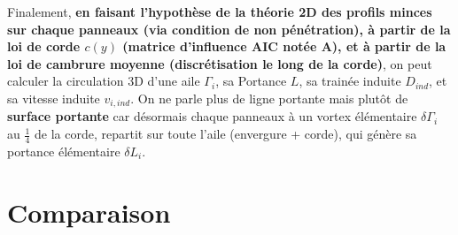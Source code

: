 Finalement, \textbf{en faisant l'hypothèse de la théorie 2D des profils minces sur chaque panneaux (via condition de non pénétration), à partir de la loi de corde $c(y)$ (matrice d'influence AIC notée A), et à partir de la loi de cambrure moyenne (discrétisation le long de la corde)}, on peut calculer la circulation 3D d'une aile $\Gamma_i$, sa Portance $L$, sa trainée induite $D_{ind}$, et sa vitesse induite $v_{i, ind}$. On ne parle plus de ligne portante mais plutôt de \textbf{surface portante} car désormais chaque panneaux à un vortex élémentaire $\delta\Gamma_i$ au $\frac{1}{4}$ de la corde, repartit sur toute l'aile (envergure + corde), qui génère sa portance élémentaire $\delta L_i$.


\section{Comparaison} 
\label{sec:Ch1.4}

